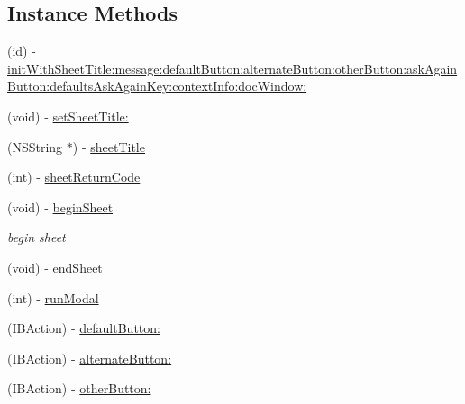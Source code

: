 \subsection*{Instance Methods}
\begin{DoxyCompactItemize}
\item 
(id) -\/ \hyperlink{interface_confirmation_sheet_controller_a990c892f214027b444e49d48b441535c}{init\-With\-Sheet\-Title\-:message\-:default\-Button\-:alternate\-Button\-:other\-Button\-:ask\-Again\-Button\-:defaults\-Ask\-Again\-Key\-:context\-Info\-:doc\-Window\-:}
\item 
(void) -\/ \hyperlink{interface_confirmation_sheet_controller_a4c8a147a5f86c949017d735c1097a016}{set\-Sheet\-Title\-:}
\item 
(N\-S\-String $\ast$) -\/ \hyperlink{interface_confirmation_sheet_controller_ae21afc63120fc54f21af093b48dbd3a4}{sheet\-Title}
\item 
(int) -\/ \hyperlink{interface_confirmation_sheet_controller_ae127de758d9bcd83bc2ddc2d8f4234c6}{sheet\-Return\-Code}
\item 
(void) -\/ \hyperlink{interface_confirmation_sheet_controller_ab2bc9af004e55b53e6776a60139bd9da}{begin\-Sheet}
\begin{DoxyCompactList}\small\item\em begin sheet \end{DoxyCompactList}\item 
(void) -\/ \hyperlink{interface_confirmation_sheet_controller_ad73bf69ade5214ad7f61681509587167}{end\-Sheet}
\item 
(int) -\/ \hyperlink{interface_confirmation_sheet_controller_a912082d1644fa81e07d87ce9b4e34a53}{run\-Modal}
\item 
(I\-B\-Action) -\/ \hyperlink{interface_confirmation_sheet_controller_a7040b71e01a6dd1b38469460acd92821}{default\-Button\-:}
\item 
(I\-B\-Action) -\/ \hyperlink{interface_confirmation_sheet_controller_a4830200c86cd298cbf84693cf078f840}{alternate\-Button\-:}
\item 
(I\-B\-Action) -\/ \hyperlink{interface_confirmation_sheet_controller_ab83f53dc3a85c113fc14d48af59a0221}{other\-Button\-:}
\end{DoxyCompactItemize}
